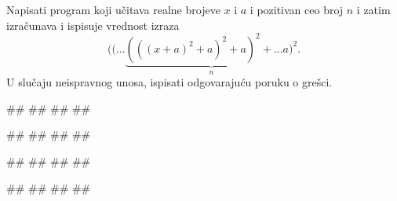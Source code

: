 \begin{Exercise}[label=PET_49] 
Napisati program koji učitava realne brojeve $x$ i $a$ i pozitivan ceo broj $n$ i
zatim izračunava i ispisuje vrednost izraza
 $$((\ldots \underbrace{(((x+a)^2 + a)^2 + a)^2 + \ldots a)^2}_n.$$
U slučaju neispravnog unosa, ispisati odgovarajuću poruku o grešci.

\begin{miditest}
\begin{upotreba}{1}
#\naslovInt#
##
##
##
\end{upotreba}
\end{miditest}
\begin{miditest}
\begin{upotreba}{2}
#\naslovInt#
##
##
##
\end{upotreba}
\end{miditest}

\begin{miditest}
\begin{upotreba}{3}
#\naslovInt#
##
##
##
\end{upotreba}
\end{miditest}
\begin{miditest}
\begin{upotreba}{4}
#\naslovInt#
##
##
##
\end{upotreba}
\end{miditest}
\end{Exercise}
\ifresenja
\begin{Answer}[ref=PET_49]
\end{Answer}
\fi


